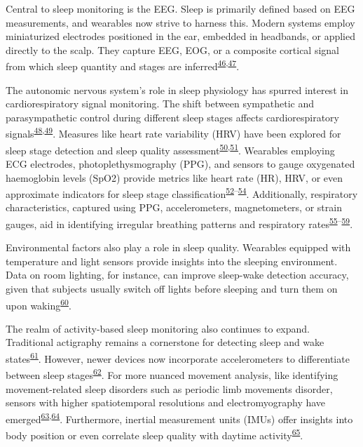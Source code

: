 \documentclass[
  9pt,
]{scrbook}
\begin{document}
Central to sleep monitoring is the EEG. Sleep is primarily defined based
on EEG measurements, and wearables now strive to harness this. Modern
systems employ miniaturized electrodes positioned in the ear, embedded
in headbands, or applied directly to the scalp. They capture EEG, EOG,
or a composite cortical signal from which sleep quantity and stages are
inferred\textsuperscript{\protect\hyperlink{ref-mikkelsen_2019}{46},\protect\hyperlink{ref-levendowski_2017}{47}}.

The autonomic nervous system's role in sleep physiology has spurred
interest in cardiorespiratory signal monitoring. The shift between
sympathetic and parasympathetic control during different sleep stages
affects cardiorespiratory
signals\textsuperscript{\protect\hyperlink{ref-tobaldini_2013}{48},\protect\hyperlink{ref-somers_1993}{49}}.
Measures like heart rate variability (HRV) have been explored for sleep
stage detection and sleep quality
assessment\textsuperscript{\protect\hyperlink{ref-radha_sleep_2019}{50},\protect\hyperlink{ref-kuula_2021}{51}}.
Wearables employing ECG electrodes, photoplethysmography (PPG), and
sensors to gauge oxygenated haemoglobin levels (SpO2) provide metrics
like heart rate (HR), HRV, or even approximate indicators for sleep
stage
classification\textsuperscript{\protect\hyperlink{ref-kinnunen_2020}{52}--\protect\hyperlink{ref-braun_2020}{54}}.
Additionally, respiratory characteristics, captured using PPG,
accelerometers, magnetometers, or strain gauges, aid in identifying
irregular breathing patterns and respiratory
rates\textsuperscript{\protect\hyperlink{ref-preejith_2017}{55}--\protect\hyperlink{ref-jarchi_2018}{59}}.

Environmental factors also play a role in sleep quality. Wearables
equipped with temperature and light sensors provide insights into the
sleeping environment. Data on room lighting, for instance, can improve
sleep-wake detection accuracy, given that subjects usually switch off
lights before sleeping and turn them on upon
waking\textsuperscript{\protect\hyperlink{ref-price_2012}{60}}.

The realm of activity-based sleep monitoring also continues to expand.
Traditional actigraphy remains a cornerstone for detecting sleep and
wake states\textsuperscript{\protect\hyperlink{ref-chase_2022}{61}}.
However, newer devices now incorporate accelerometers to differentiate
between sleep
stages\textsuperscript{\protect\hyperlink{ref-sundararajan_sleep_2021}{62}}.
For more nuanced movement analysis, like identifying movement-related
sleep disorders such as periodic limb movements disorder, sensors with
higher spatiotemporal resolutions and electromyography have
emerged\textsuperscript{\protect\hyperlink{ref-jortberg_2018}{63},\protect\hyperlink{ref-athavale_2017}{64}}.
Furthermore, inertial measurement units (IMUs) offer insights into body
position or even correlate sleep quality with daytime
activity\textsuperscript{\protect\hyperlink{ref-razjouyan_2017}{65}}.
\end{document}

